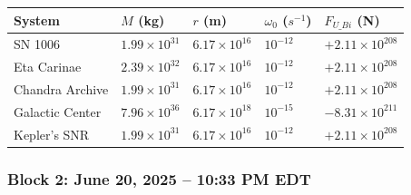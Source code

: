 \documentclass[
  11pt,
]{article}
\newcounter{none} %
\begin{document}
{\def\LTcaptype{none} %
\begin{longtable}[]{@{}
  >{\raggedright\arraybackslash}p{}
  >{\raggedright\arraybackslash}p{}
  >{\raggedright\arraybackslash}p{}
  >{\raggedright\arraybackslash}p{}
  >{\raggedright\arraybackslash}p{}@{}}
\toprule\noalign{}
\begin{minipage}[b]{\linewidth}\raggedright
System
\end{minipage} & \begin{minipage}[b]{\linewidth}\raggedright
\(M\) (kg)
\end{minipage} & \begin{minipage}[b]{\linewidth}\raggedright
\(r\) (m)
\end{minipage} & \begin{minipage}[b]{\linewidth}\raggedright
\(\omega_0\) (\(s^{-1}\))
\end{minipage} & \begin{minipage}[b]{\linewidth}\raggedright
\(F_{U\_Bi}\) (N)
\end{minipage} \\
\midrule\noalign{}
\endhead
\bottomrule\noalign{}
\endlastfoot
SN 1006 & \(1.99\times10^{31}\) & \(6.17\times10^{16}\) & \(10^{-12}\) &
\(+2.11\times10^{208}\) \\
Eta Carinae & \(2.39\times10^{32}\) & \(6.17\times10^{16}\) &
\(10^{-12}\) & \(+2.11\times10^{208}\) \\
Chandra Archive & \(1.99\times10^{31}\) & \(6.17\times10^{16}\) &
\(10^{-12}\) & \(+2.11\times10^{208}\) \\
Galactic Center & \(7.96\times10^{36}\) & \(6.17\times10^{18}\) &
\(10^{-15}\) & \(-8.31\times10^{211}\) \\
Kepler's SNR & \(1.99\times10^{31}\) & \(6.17\times10^{16}\) &
\(10^{-12}\) & \(+2.11\times10^{208}\) \\
\end{longtable}
}

\subsubsection{Block 2: June 20, 2025 -- 10:33 PM
EDT}\label{block-2-june-20-2025-1033-pm-edt}
\end{document}

